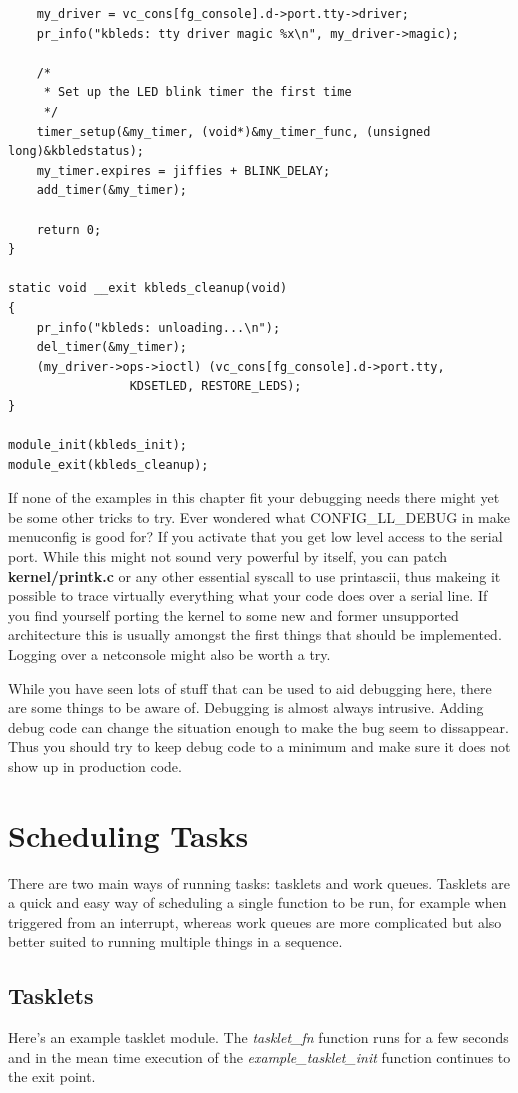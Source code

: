 \documentclass[11pt]{article}
\begin{document}
\begin{verbatim}
    my_driver = vc_cons[fg_console].d->port.tty->driver;
    pr_info("kbleds: tty driver magic %x\n", my_driver->magic);

    /*
     * Set up the LED blink timer the first time
     */
    timer_setup(&my_timer, (void*)&my_timer_func, (unsigned long)&kbledstatus);
    my_timer.expires = jiffies + BLINK_DELAY;
    add_timer(&my_timer);

    return 0;
}

static void __exit kbleds_cleanup(void)
{
    pr_info("kbleds: unloading...\n");
    del_timer(&my_timer);
    (my_driver->ops->ioctl) (vc_cons[fg_console].d->port.tty,
			     KDSETLED, RESTORE_LEDS);
}

module_init(kbleds_init);
module_exit(kbleds_cleanup);
\end{verbatim}

If none of the examples in this chapter fit your debugging needs there might yet be some other tricks to try. Ever wondered what CONFIG\_LL\_DEBUG in make menuconfig is good for? If you activate that you get low level access to the serial port. While this might not sound very powerful by itself, you can patch \textbf{kernel/printk.c} or any other essential syscall to use printascii, thus makeing it possible to trace virtually everything what your code does over a serial line. If you find yourself porting the kernel to some new and former unsupported architecture this is usually amongst the first things that should be implemented. Logging over a netconsole might also be worth a try.

While you have seen lots of stuff that can be used to aid debugging here, there are some things to be aware of. Debugging is almost always intrusive. Adding debug code can change the situation enough to make the bug seem to dissappear. Thus you should try to keep debug code to a minimum and make sure it does not show up in production code.

\section{Scheduling Tasks}
\label{sec:orgb1eb02f}
There are two main ways of running tasks: tasklets and work queues. Tasklets are a quick and easy way of scheduling a single function to be run, for example when triggered from an interrupt, whereas work queues are more complicated but also better suited to running multiple things in a sequence.

\subsection{Tasklets}
\label{sec:org5b372fb}
Here's an example tasklet module. The \emph{tasklet\_fn} function runs for a few seconds and in the mean time execution of the \emph{example\_tasklet\_init} function continues to the exit point.
\end{document}
